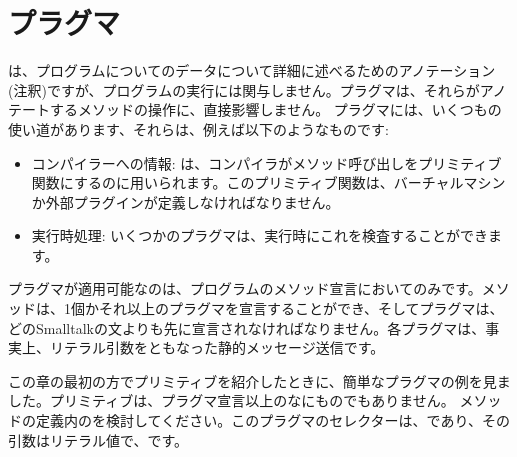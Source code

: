 \documentclass[a4paper,10pt,twoside]{book}
\begin{document}
\section{プラグマ}

は、プログラムについてのデータについて詳細に述べるためのアノテーション(注釈)ですが、プログラムの実行には関与しません。プラグマは、それらがアノテートするメソッドの操作に、直接影響しません。
プラグマには、いくつもの使い道があります、それらは、例えば以下のようなものです:
\begin{itemize}
\item コンパイラーへの情報: は、コンパイラがメソッド呼び出しをプリミティブ関数にするのに用いられます。このプリミティブ関数は、バーチャルマシンか外部プラグインが定義しなければなりません。
\item 実行時処理: いくつかのプラグマは、実行時にこれを検査することができます。%
\end{itemize}

プラグマが適用可能なのは、プログラムのメソッド宣言においてのみです。メソッドは、1個かそれ以上のプラグマを宣言することができ、そしてプラグマは、どのSmalltalkの文よりも先に宣言されなければなりません。各プラグマは、事実上、リテラル引数をともなった静的メッセージ送信です。

この章の最初の方でプリミティブを紹介したときに、簡単なプラグマの例を見ました。プリミティブは、プラグマ宣言以上のなにものでもありません。 
メソッドの定義内のを検討してください。このプラグマのセレクターは、であり、その引数はリテラル値で、です。%
\end{document}

